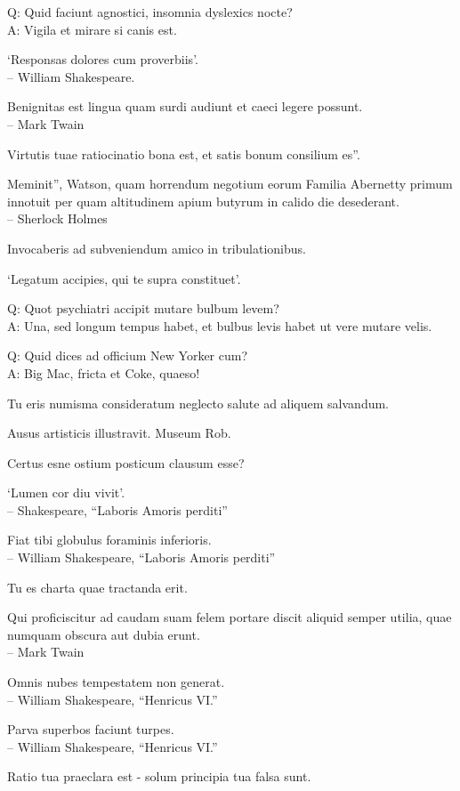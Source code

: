 \documentclass[titlepage,12pt]{memoir}
\begin{document}
Q: Quid faciunt agnostici, insomnia dyslexics nocte?\\
A: Vigila et mirare si canis est.

‘Responsas dolores cum proverbiis’.
\\-- William Shakespeare.

 Benignitas est lingua quam surdi audiunt et caeci legere possunt.
\\-- Mark Twain

Virtutis tuae ratiocinatio bona est, et satis bonum consilium es”.

Meminit”, Watson, quam horrendum negotium eorum
Familia Abernetty primum innotuit per quam altitudinem
apium butyrum in calido die desederant.
\\-- Sherlock Holmes

Invocaberis ad subveniendum amico in tribulationibus.

‘Legatum accipies, qui te supra constituet’.

Q: Quot psychiatri accipit mutare bulbum levem?\\
A: Una, sed longum tempus habet, et bulbus levis habet
ut vere mutare velis.

Q: Quid dices ad officium New Yorker cum?\\
A: Big Mac, fricta et Coke, quaeso!

Tu eris numisma consideratum neglecto salute ad aliquem salvandum.

Ausus artisticis illustravit. Museum Rob.

 Certus esne ostium posticum clausum esse?

‘Lumen cor diu vivit’.
\\-- Shakespeare, “Laboris Amoris perditi”

Fiat tibi globulus foraminis inferioris.
\\-- William Shakespeare, “Laboris Amoris perditi”

Tu es charta quae tractanda erit.

Qui proficiscitur ad caudam suam felem portare discit aliquid
semper utilia, quae numquam obscura aut dubia erunt.
\\-- Mark Twain

Omnis nubes tempestatem non generat.
\\-- William Shakespeare, “Henricus VI.”

Parva superbos faciunt turpes.
\\-- William Shakespeare, “Henricus VI.”

Ratio tua praeclara est - solum principia tua falsa sunt.
\end{document}

